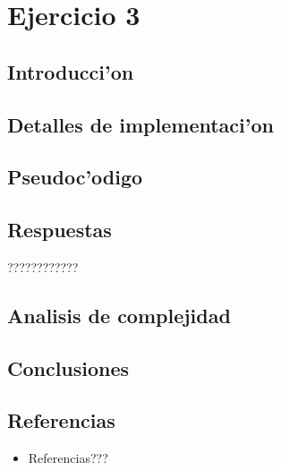 \newpage
\section{Ejercicio 3}

\subsection{Introducci'on}


\subsection{Detalles de implementaci'on}


\subsection{Pseudoc'odigo}


\subsection{Respuestas}
????????????

\subsection{Analisis de complejidad}


\subsection{Conclusiones}


\subsection{Referencias}
\begin{itemize}
    \item Referencias???
\end{itemize}

